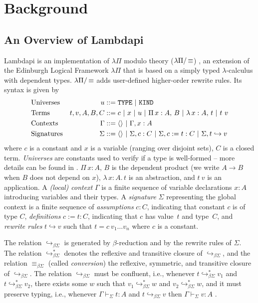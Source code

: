 \section{Background}
\label{sec:background}

\subsection{An Overview of Lambdapi}
\label{ssect:lambdapi-overview}

Lambdapi is an implementation of $\lambda\Pi$ modulo theory ($\lpm$) \cite{lambdapi}, an extension of the Edinburgh Logical Framework $\lambda\Pi$ \cite{lf} that is based on a simply typed $\lambda$-calculus with dependent types. $\lpm$ adds user-defined higher-order rewrite rules. Its syntax is given by
%
\begin{align*}
&\text{Universes}  &u &::= \tt{TYPE} ~|~ \tt{KIND} \\
&\text{Terms}   &t,v, A,B,C &::= c ~|~ x ~|~ u ~|~ \Pi\,x : A,\,B~|~ \lambda\,x : A,\,t ~|~t~v \\
&\text{Contexts}   &\Gamma &::= \langle \rangle ~|~ \Gamma, x : A \\
&\text{Signatures}  &\Sigma &::= \langle \rangle ~|~ \Sigma, c : C ~|~ \Sigma, c := t : C ~|~ \Sigma, t \hookrightarrow v 
\end{align*}
%
where $c$ is a constant and $x$ is a variable  (ranging over disjoint sets), $C$ is a closed term. \emph{Universes} are constants used to verify if a type is well-formed -- more details can be found in \cite[\S 2.1]{lf}. $\Pi\,x : A,\,B$ is the dependent product (we write $A \rightarrow B$ when $B$ does not depend on $x$), $\lambda\,x : A.\,t$ is an abstraction, and  $t~v$ is an application. A \emph{(local) context} $\Gamma$ is a finite sequence of variable declarations $x:A$ introducing variables and their types.
A \emph{signature} $\Sigma$ representing the global context is a finite sequence of \emph{assumptions} $c : C$, indicating that constant $c$ is of type $C$, \emph{definitions} $c := t : C$, indicating that $c$ has value~$t$ and type~$C$, and \emph{rewrite rules} $t \hookrightarrow v$ such that $t = c~v_1 \dots v_n$ where $c$ is a constant.

The relation $\hookrightarrow_{\beta\Sigma}$ is generated by $\beta$-reduction and by the rewrite rules of $\Sigma$. The relation $\hookrightarrow_{\beta\Sigma}^*$ denotes the reflexive and transitive closure of $\hookrightarrow_{\beta\Sigma}$, and the relation $\equiv_{\beta\Sigma}$ (called \emph{conversion}) the reflexive, symmetric, and transitive closure of $\hookrightarrow_{\beta\Sigma}$. 
The relation $\hookrightarrow_{\beta\Sigma}$ must be confluent, i.e.,
whenever $t \hookrightarrow_{\beta\Sigma}^* v_1$ and $t \hookrightarrow_{\beta\Sigma}^* v_2$, there exists some $w$ such that $v_1 \hookrightarrow_{\beta\Sigma}^* w$ and $v_2 \hookrightarrow_{\beta\Sigma}^* w$, and it must preserve typing, i.e., 
whenever $\Gamma \vdash_\Sigma t: A$ and $t \hookrightarrow_{\beta\Sigma} v$ then $\Gamma \vdash_\Sigma v: A$ \cite{blanqui:LIPIcs.FSCD.2020.13}.

